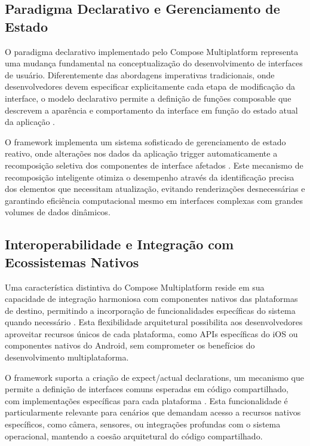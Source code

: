 \subsection{Paradigma Declarativo e Gerenciamento de Estado}

O paradigma declarativo implementado pelo Compose Multiplatform representa uma mudança fundamental na conceptualização do desenvolvimento de interfaces de usuário. Diferentemente das abordagens imperativas tradicionais, onde desenvolvedores devem especificar explicitamente cada etapa de modificação da interface, o modelo declarativo permite a definição de funções composable que descrevem a aparência e comportamento da interface em função do estado atual da aplicação \cite{gamma2023reactive}.

O framework implementa um sistema sofisticado de gerenciamento de estado reativo, onde alterações nos dados da aplicação trigger automaticamente a recomposição seletiva dos componentes de interface afetados \cite{compose2023state}. Este mecanismo de recomposição inteligente otimiza o desempenho através da identificação precisa dos elementos que necessitam atualização, evitando renderizações desnecessárias e garantindo eficiência computacional mesmo em interfaces complexas com grandes volumes de dados dinâmicos.

\subsection{Interoperabilidade e Integração com Ecossistemas Nativos}

Uma característica distintiva do Compose Multiplatform reside em sua capacidade de integração harmoniosa com componentes nativos das plataformas de destino, permitindo a incorporação de funcionalidades específicas do sistema quando necessário \cite{jetbrains2023interop}. Esta flexibilidade arquitetural possibilita aos desenvolvedores aproveitar recursos únicos de cada plataforma, como APIs específicas do iOS ou componentes nativos do Android, sem comprometer os benefícios do desenvolvimento multiplataforma.

O framework suporta a criação de expect/actual declarations, um mecanismo que permite a definição de interfaces comuns esperadas em código compartilhado, com implementações específicas para cada plataforma \cite{kotlin2023expect}. Esta funcionalidade é particularmente relevante para cenários que demandam acesso a recursos nativos específicos, como câmera, sensores, ou integrações profundas com o sistema operacional, mantendo a coesão arquitetural do código compartilhado.

